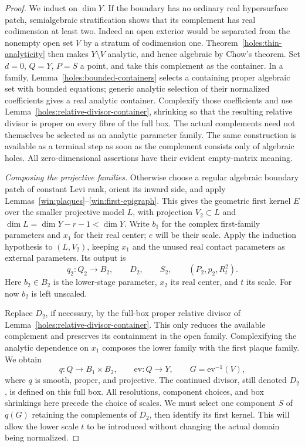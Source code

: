 \begin{proof}
We induct on $\dim Y$.  If the boundary has no ordinary real
hypersurface patch, semialgebraic stratification shows that its
complement has real codimension at least two.  Indeed an open
exterior would be separated from the nonempty open set $V$ by a
stratum of codimension one.  Theorem~\ref{holes:thin-analyticity}
then makes $Y\setminus V$ analytic, and hence algebraic by Chow's
theorem.  Set $d=0$, $Q=Y$, $P=S$ a point, and take this complement
as the container.  In a family, Lemma~\ref{holes:bounded-containers}
selects a containing proper algebraic set with bounded equations;
generic analytic selection of their normalized coefficients gives
a real analytic container.  Complexify those coefficients and
use Lemma~\ref{holes:relative-divisor-container}, shrinking so that
the resulting relative divisor is proper on every fibre of the
full box.  The actual complements need not themselves be selected
as an analytic parameter family.  The same construction is available as a terminal
step as soon as the complement consists only of algebraic holes.
All zero-dimensional assertions have their evident empty-matrix
meaning.

\emph{Composing the projective families.}
Otherwise choose a regular algebraic boundary patch of constant Levi
rank, orient its inward side, and apply
Lemmas~\ref{win:plaques}--\ref{win:first-epigraph}.  This gives the
geometric first kernel $E$ over the smaller projective model $L$,
with projection $V_2\subset L$ and $\dim L=\dim Y-r-1<\dim Y$.
Write $b_1$ for the complex first-family parameters and $x_1$ for
their real center; $e$ will be their scale.  Apply the induction
hypothesis to $(L,V_2)$, keeping $x_1$ and the unused real contact
parameters as external parameters.  Its output is
\[
 q_2:Q_2\to B_2,\qquad D_2,\qquad S_2,\qquad
 (P_2,p_2,R_t^2).
\]
Here $b_2\in B_2$ is the lower-stage parameter, $x_2$ its real
center, and $t$ its scale.  For now $b_2$ is left unscaled.

Replace $D_2$, if necessary, by the full-box proper relative divisor
of Lemma~\ref{holes:relative-divisor-container}.  This only reduces
the available complement and preserves its containment in the open
family.  Complexifying the analytic dependence on $x_1$ composes
the lower family with the first plaque family.  We obtain
\[
 q:Q\longrightarrow B_1\times B_2,
 \qquad \mathrm{ev}:Q\longrightarrow Y,
 \qquad G=\mathrm{ev}^{-1}(V),
\]
where $q$ is smooth, proper, and projective.  The continued divisor,
still denoted $D_2$, is defined on this full box.  All resolutions,
component choices, and box shrinkings here precede the choice of
scales.  We must select one component $S$ of $q(G)$ retaining the
complements of $D_2$, then identify its first kernel.  This will
allow the lower scale $t$ to be introduced without changing the
actual domain being normalized.


\end{proof}
